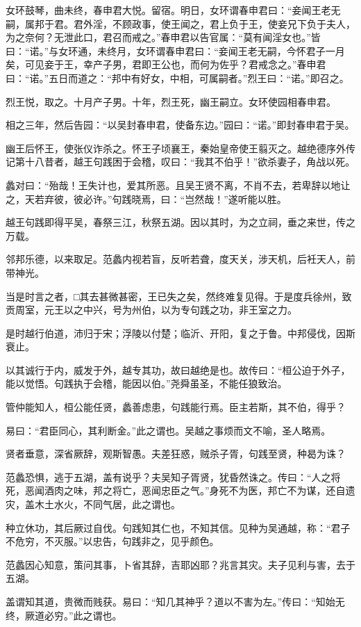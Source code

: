\documentclass[12pt,UTF8]{ctexbook}
\begin{document}
女环鼓琴，曲未终，春申君大悦。留宿。明日，女环谓春申君曰：“妾闻王老无嗣，属邦于君。君外淫，不顾政事，使王闻之，君上负于王，使妾兄下负于夫人，为之奈何？无泄此口，君召而戒之。”春申君以告官属：“莫有闻淫女也。”皆曰：“诺。”与女环通，未终月，女环谓春申君曰：“妾闻王老无嗣，今怀君子一月矣，可见妾于王，幸产子男，君即王公也，而何为佐乎？君戒念之。”春申君曰：“诺。”五日而道之：“邦中有好女，中相，可属嗣者。”烈王曰：“诺。”即召之。

烈王悦，取之。十月产子男。十年，烈王死，幽王嗣立。女环使园相春申君。

相之三年，然后告园：“以吴封春申君，使备东边。”园曰：“诺。”即封春申君于吴。

幽王后怀王，使张仪诈杀之。怀王子顷襄王，秦始皇帝使王翦灭之。越绝德序外传记第十八昔者，越王句践困于会稽，叹曰：“我其不伯乎！”欲杀妻子，角战以死。

蠡对曰：“殆哉！王失计也，爱其所恶。且吴王贤不离，不肖不去，若卑辞以地让之，天若弃彼，彼必许。”句践晓焉，曰：“岂然哉！”遂听能以胜。

越王句践即得平吴，春祭三江，秋祭五湖。因以其时，为之立祠，垂之来世，传之万载。

邻邦乐德，以来取足。范蠡内视若盲，反听若聋，度天关，涉天机，后衽天人，前带神光。

当是时言之者，□其去甚微甚密，王已失之矣，然终难复见得。于是度兵徐州，致贡周室，元王以之中兴，号为州伯，以为专句践之功，非王室之力。

是时越行伯道，沛归于宋；浮陵以付楚；临沂、开阳，复之于鲁。中邦侵伐，因斯衰止。

以其诚行于内，威发于外，越专其功，故曰越绝是也。故传曰：“桓公迫于外子，能以觉悟。句践执于会稽，能因以伯。”尧舜虽圣，不能任狼致治。

管仲能知人，桓公能任贤，蠡善虑患，句践能行焉。臣主若斯，其不伯，得乎？

易曰：“君臣同心，其利断金。”此之谓也。吴越之事烦而文不喻，圣人略焉。

贤者垂意，深省厥辞，观斯智愚。夫差狂惑，贼杀子胥，句践至贤，种曷为诛？

范蠡恐惧，逃于五湖，盖有说乎？夫吴知子胥贤，犹昏然诛之。传曰：“人之将死，恶闻酒肉之味，邦之将亡，恶闻忠臣之气。”身死不为医，邦亡不为谋，还自遗灾，盖木土水火，不同气居，此之谓也。

种立休功，其后厥过自伐。句践知其仁也，不知其信。见种为吴通越，称：“君子不危穷，不灭服。”以忠告，句践非之，见乎颜色。

范蠡因心知意，策问其事，卜省其辞，吉耶凶耶？兆言其灾。夫子见利与害，去于五湖。

盖谓知其道，贵微而贱获。易曰：“知几其神乎？道以不害为左。”传曰：“知始无终，厥道必穷。”此之谓也。
\end{document}
